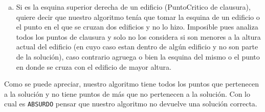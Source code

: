 \begin{enumerate}[I]
\begin{enumerate}[(a)]
		\item Si es la esquina superior derecha de un edificio (PuntoCritico de clausura), quiere decir que nuestro algoritmo ten\'ia que tomar la esquina de un edificio o el punto en el que se cruzan dos edificios y no lo hizo. Imposible pues analiza todos los puntos de clausura y solo no los considera si son menores a la altura actual del edificio (en cuyo caso estan dentro de alg\'un edificio y no son parte de la soluci\'on), caso contrario agruega o bien la esquina del mismo o el punto en donde se cruza con el edificio de mayor altura.
	\end{enumerate}
\end{enumerate}

Como se puede apreciar, nuestro algoritmo tiene todos los puntos que pertenecen a la soluci\'on y no tiene puntos de m\'as que no pertenecen a la soluci\'on. Con lo cual es \texttt{ABSURDO} pensar que nuestro algoritmo no devuelve una soluci\'on correcta.